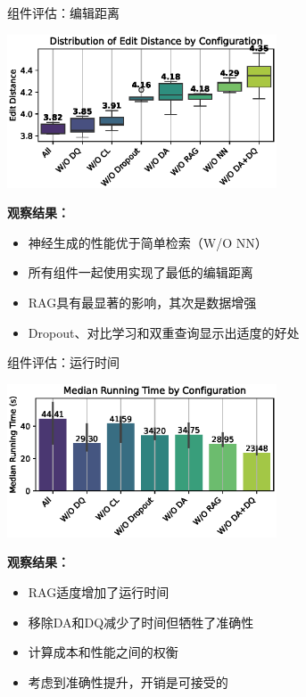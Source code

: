 \documentclass[aspectratio=1610]{beamer}
\begin{document}
    \begin{frame}{组件评估：编辑距离}
        \begin{center}
            \includegraphics[width=0.6\textwidth]{figs/ablation_study_accuracy_10.eps}
        \end{center}

        \textbf{观察结果：}
        \begin{itemize}
            \item 神经生成的性能优于简单检索（W/O NN）
            \item 所有组件一起使用实现了最低的编辑距离
            \item RAG具有最显著的影响，其次是数据增强
            \item Dropout、对比学习和双重查询显示出适度的好处
        \end{itemize}
    \end{frame}

    \begin{frame}{组件评估：运行时间}
        \begin{center}
            \includegraphics[width=0.6\textwidth]{figs/ablation_study_time_10.eps}
        \end{center}

        \textbf{观察结果：}
        \begin{itemize}
            \item RAG适度增加了运行时间
            \item 移除DA和DQ减少了时间但牺牲了准确性
            \item 计算成本和性能之间的权衡
            \item 考虑到准确性提升，开销是可接受的
        \end{itemize}
    \end{frame}
\end{document}
